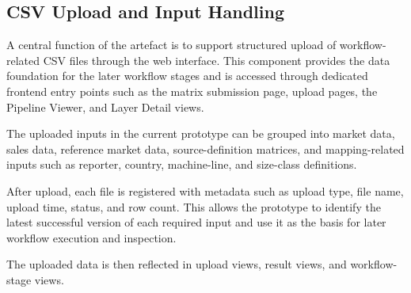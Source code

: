 \subsection{CSV Upload and Input Handling}

A central function of the artefact is to support structured upload of workflow-related CSV files through the web interface. This component provides the data foundation for the later workflow stages and is accessed through dedicated frontend entry points such as the matrix submission page, upload pages, the Pipeline Viewer, and Layer Detail views.

The uploaded inputs in the current prototype can be grouped into market data, sales data, reference market data, source-definition matrices, and mapping-related inputs such as reporter, country, machine-line, and size-class definitions.

After upload, each file is registered with metadata such as upload type, file name, upload time, status, and row count. This allows the prototype to identify the latest successful version of each required input and use it as the basis for later workflow execution and inspection.

The uploaded data is then reflected in upload views, result views, and workflow-stage views.






























